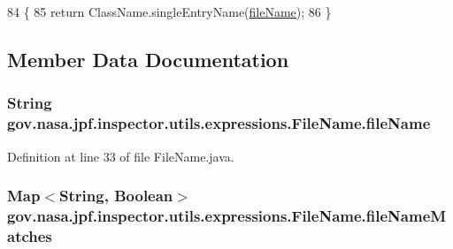 \begin{DoxyCode}
84                                         \{
85     \textcolor{keywordflow}{return} ClassName.singleEntryName(\hyperlink{classgov_1_1nasa_1_1jpf_1_1inspector_1_1utils_1_1expressions_1_1_file_name_a2131d6d2566db269cb64fd7e7b5b914c}{fileName});
86   \}
\end{DoxyCode}


\subsection{Member Data Documentation}
\subsubsection[{\texorpdfstring{file\+Name}{fileName}}]{\setlength{\rightskip}{0pt plus 5cm}String gov.\+nasa.\+jpf.\+inspector.\+utils.\+expressions.\+File\+Name.\+file\+Name\hspace{0.3cm}{\ttfamily [private]}}\hypertarget{classgov_1_1nasa_1_1jpf_1_1inspector_1_1utils_1_1expressions_1_1_file_name_a2131d6d2566db269cb64fd7e7b5b914c}{}\label{classgov_1_1nasa_1_1jpf_1_1inspector_1_1utils_1_1expressions_1_1_file_name_a2131d6d2566db269cb64fd7e7b5b914c}


Definition at line 33 of file File\+Name.\+java.

\subsubsection[{\texorpdfstring{file\+Name\+Matches}{fileNameMatches}}]{\setlength{\rightskip}{0pt plus 5cm}Map$<$String, Boolean$>$ gov.\+nasa.\+jpf.\+inspector.\+utils.\+expressions.\+File\+Name.\+file\+Name\+Matches\hspace{0.3cm}{\ttfamily [private]}}\hypertarget{classgov_1_1nasa_1_1jpf_1_1inspector_1_1utils_1_1expressions_1_1_file_name_ad9f0dfc4e0c754de534e5eb87fdcb2fa}{}\label{classgov_1_1nasa_1_1jpf_1_1inspector_1_1utils_1_1expressions_1_1_file_name_ad9f0dfc4e0c754de534e5eb87fdcb2fa}


